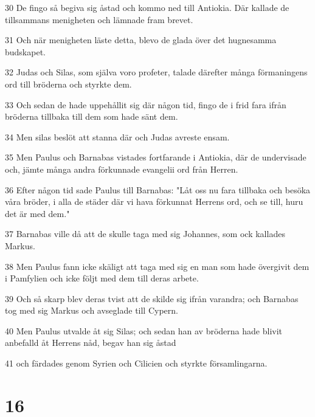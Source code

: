 \par 30 De fingo så begiva sig åstad och kommo ned till Antiokia. Där kallade de tillsammans menigheten och lämnade fram brevet.
\par 31 Och när menigheten läste detta, blevo de glada över det hugnesamma budskapet.
\par 32 Judas och Silas, som själva voro profeter, talade därefter många förmaningens ord till bröderna och styrkte dem.
\par 33 Och sedan de hade uppehållit sig där någon tid, fingo de i frid fara ifrån bröderna tillbaka till dem som hade sänt dem.
\par 34 Men silas beslöt att stanna där och Judas avreste ensam.
\par 35 Men Paulus och Barnabas vistades fortfarande i Antiokia, där de undervisade och, jämte många andra förkunnade evangelii ord från Herren.
\par 36 Efter någon tid sade Paulus till Barnabas: "Låt oss nu fara tillbaka och besöka våra bröder, i alla de städer där vi hava förkunnat Herrens ord, och se till, huru det är med dem."
\par 37 Barnabas ville då att de skulle taga med sig Johannes, som ock kallades Markus.
\par 38 Men Paulus fann icke skäligt att taga med sig en man som hade övergivit dem i Pamfylien och icke följt med dem till deras arbete.
\par 39 Och så skarp blev deras tvist att de skilde sig ifrån varandra; och Barnabas tog med sig Markus och avseglade till Cypern.
\par 40 Men Paulus utvalde åt sig Silas; och sedan han av bröderna hade blivit anbefalld åt Herrens nåd, begav han sig åstad
\par 41 och färdades genom Syrien och Cilicien och styrkte församlingarna.

\chapter{16}

